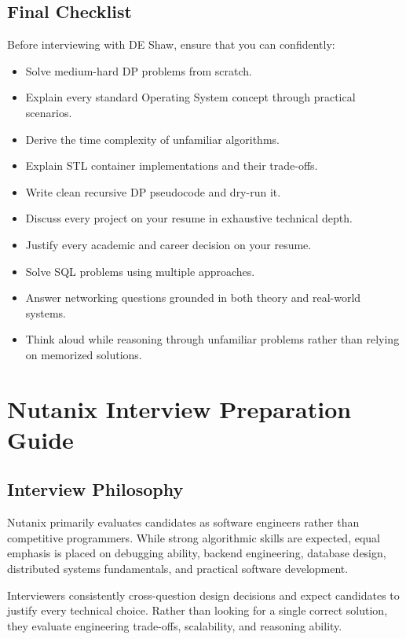 \documentclass[11pt,a4paper]{article}
\begin{document}

\subsection{Final Checklist}

Before interviewing with DE Shaw, ensure that you can confidently:

\begin{itemize}
	\item Solve medium-hard DP problems from scratch.
	\item Explain every standard Operating System concept through practical scenarios.
	\item Derive the time complexity of unfamiliar algorithms.
	\item Explain STL container implementations and their trade-offs.
	\item Write clean recursive DP pseudocode and dry-run it.
	\item Discuss every project on your resume in exhaustive technical depth.
	\item Justify every academic and career decision on your resume.
	\item Solve SQL problems using multiple approaches.
	\item Answer networking questions grounded in both theory and real-world systems.
	\item Think aloud while reasoning through unfamiliar problems rather than relying on memorized solutions.
\end{itemize}


\section{Nutanix Interview Preparation Guide}

\subsection{Interview Philosophy}

Nutanix primarily evaluates candidates as software engineers rather than competitive programmers. While strong algorithmic skills are expected, equal emphasis is placed on debugging ability, backend engineering, database design, distributed systems fundamentals, and practical software development.

Interviewers consistently cross-question design decisions and expect candidates to justify every technical choice. Rather than looking for a single correct solution, they evaluate engineering trade-offs, scalability, and reasoning ability.
\end{document}
